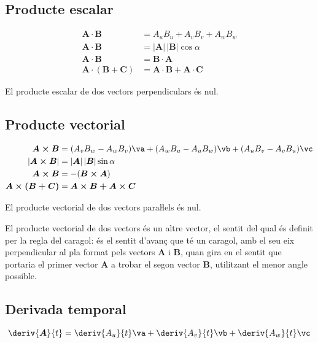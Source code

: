 \documentclass[catalan,a4paper,twoside,11pt]{article}
\begin{document}
\subsection{Producte escalar}
\vspace{-5mm}
\begin{align}
    \boldsymbol{A\cdot B} &= A_u B_u + A_v B_v + A_w B_w\\
    \boldsymbol{A\cdot B} &=|\boldsymbol{A}| \, |\boldsymbol{B}| \cos\alpha\\
    \boldsymbol{A\cdot B} &=\boldsymbol{B\cdot A}\\
    \boldsymbol{A\cdot(B+C)} &= \boldsymbol{A\cdot B+ A\cdot C}
\end{align}

El producte escalar de dos vectors perpendiculars  és nul.

\subsection{Producte vectorial}
\vspace{-7mm}
\begin{align}
    \boldsymbol{A\times B} &= (A_v B_w - A_w B_v)\va + (A_w B_u - A_u B_w)\vb +
    (A_u B_v - A_v B_u)\vc \\
    |\boldsymbol{A\times B}| &=|\boldsymbol{A}| \, |\boldsymbol{B}| \sin\alpha\\
    \boldsymbol{A\times B} &=-(\boldsymbol{B\times A})\\
    \boldsymbol{A\times(B+C)} &= \boldsymbol{A\times B+ A\times C}
\end{align}

El producte vectorial de dos vectors paraŀlels  és nul.

El producte vectorial de dos vectors és un altre vector, el
sentit del qual és definit per la regla del caragol: és el sentit
d'avanç que té un caragol, amb el seu eix perpendicular al
pla format pels vectors  $\boldsymbol{A}$ i $\boldsymbol{B}$, quan
gira en el sentit que portaria el primer vector  $\boldsymbol{A}$ a
trobar el segon vector $\boldsymbol{B}$, utilitzant el menor angle
possible.

\subsection{Derivada temporal}
\begin{equation}
    \deriv{\boldsymbol{A}}{t} = \deriv{A_u}{t}\va +
    \deriv{A_v}{t}\vb + \deriv{A_w}{t}\vc
\end{equation}
\end{document}
